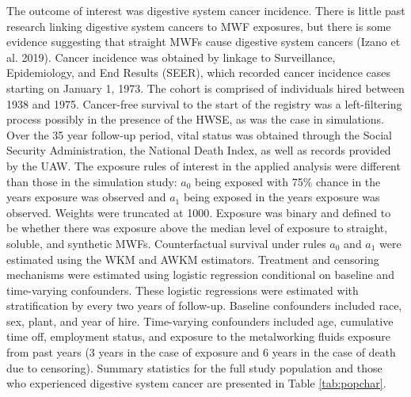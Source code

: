 \documentclass[
  11pt,
]{article}
\begin{document}
The outcome of interest was digestive system cancer incidence. There is
little past research linking digestive system cancers to MWF exposures,
but there is some evidence suggesting that straight MWFs cause digestive
system cancers (Izano et al. 2019). Cancer incidence was obtained by
linkage to Surveillance, Epidemiology, and End Results (SEER), which
recorded cancer incidence cases starting on January 1, 1973. The cohort
is comprised of individuals hired between 1938 and 1975. Cancer-free
survival to the start of the registry was a left-filtering process
possibly in the presence of the HWSE, as was the case in simulations.
Over the 35 year follow-up period, vital status was obtained through the
Social Security Administration, the National Death Index, as well as
records provided by the UAW. The exposure rules of interest in the
applied analysis were different than those in the simulation study:
\(a_0\) being exposed with 75\% chance in the years exposure was
observed and \(a_1\) being exposed in the years exposure was observed.
Weights were truncated at 1000. Exposure was binary and defined to be
whether there was exposure above the median level of exposure to
straight, soluble, and synthetic MWFs. Counterfactual survival under
rules \(a_0\) and \(a_1\) were estimated using the WKM and AWKM
estimators. Treatment and censoring mechanisms were estimated using
logistic regression conditional on baseline and time-varying
confounders. These logistic regressions were estimated with
stratification by every two years of follow-up. Baseline confounders
included race, sex, plant, and year of hire. Time-varying confounders
included age, cumulative time off, employment status, and exposure to
the metalworking fluids exposure from past years (3 years in the case of
exposure and 6 years in the case of death due to censoring). Summary
statistics for the full study population and those who experienced
digestive system cancer are presented in Table \ref{tab:popchar}.
\end{document}
